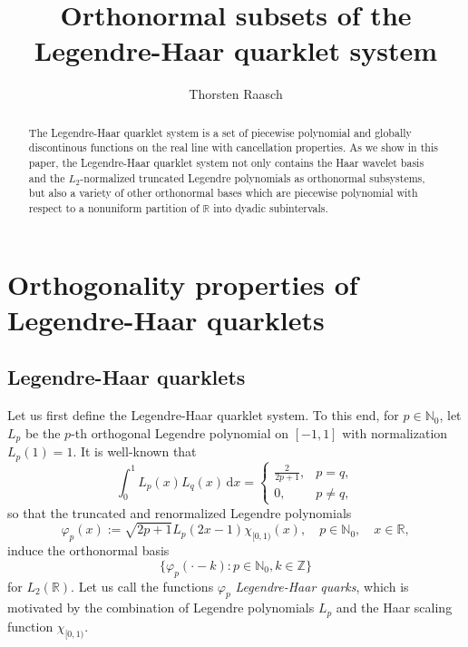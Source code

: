 \documentclass{article}
\begin{document}
\title{Orthonormal subsets of the Legendre-Haar quarklet system}
\author{Thorsten Raasch}
\maketitle

\begin{abstract}
The Legendre-Haar quarklet system is a set of piecewise polynomial and globally discontinous functions on the real line with cancellation properties. As we show in this paper, the Legendre-Haar quarklet system not only contains the Haar wavelet basis and the $L_2$-normalized truncated Legendre polynomials as orthonormal subsystems, but also a variety of other orthonormal bases which are piecewise polynomial with respect to a nonuniform partition of $\mathbb R$ into dyadic subintervals.
\end{abstract}

\section{Orthogonality properties of Legendre-Haar quarklets}
\subsection{Legendre-Haar quarklets}
Let us first define the Legendre-Haar quarklet system. To this end, for $p\in\mathbb N_0$, let $L_p$ be the $p$-th orthogonal Legendre polynomial on $[-1,1]$ with normalization $L_p(1)=1$. It is well-known that
\begin{equation*}
\int_0^1 L_p(x)L_q(x)\,\mathrm dx=\begin{cases}
\frac{2}{2p+1},&p=q,\\
0,&p\ne q,
\end{cases}
\end{equation*}
so that the truncated and renormalized Legendre polynomials
\begin{equation}
  \label{eq:phip}
  \varphi_p(x):=\sqrt{2p+1}L_p(2x-1)\chi_{[0,1)}(x),\quad
  p\in\mathbb N_0,\quad x\in\mathbb R,
\end{equation}
induce the orthonormal basis
\begin{equation*}
\big\{\varphi_p(\cdot-k):p\in\mathbb N_0,k\in\mathbb Z\big\}
\end{equation*}
for $L_2(\mathbb R)$. Let us call the functions $\varphi_p$ \emph{Legendre-Haar quarks}, which is motivated by the combination of Legendre polynomials $L_p$ and the Haar scaling function $\chi_{[0,1)}$. 
\end{document}
